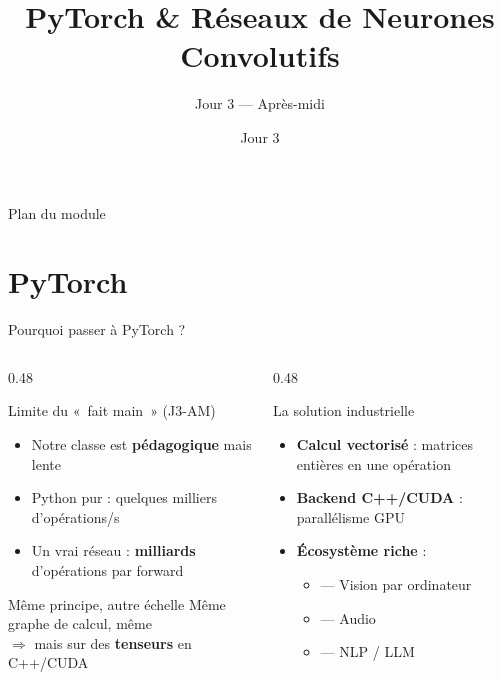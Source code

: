 \documentclass[aspectratio=169, 10pt]{beamer}
\title[PyTorch \& CNN]{PyTorch \& Réseaux de Neurones Convolutifs}
\subtitle{Jour 3 --- Après-midi}
\date{Jour 3}
\begin{document}

\begin{frame}
  \titlepage
\end{frame}

\begin{frame}{Plan du module}
  \tableofcontents
\end{frame}

\section{PyTorch}

\begin{frame}{Pourquoi passer à PyTorch ?}
  \begin{columns}[T]
    \begin{column}{0.48\textwidth}
      \begin{alertblock}{Limite du «~fait main~» (J3-AM)}
        \begin{itemize}
          \item Notre classe  est \textbf{pédagogique} mais lente
          \item Python pur : quelques milliers d'opérations/s
          \item Un vrai réseau : \textbf{milliards} d'opérations par forward
        \end{itemize}
      \end{alertblock}
      \smallskip
      \begin{exampleblock}{Même principe, autre échelle}
        Même graphe de calcul, même \\
        $\Rightarrow$ mais sur des \textbf{tenseurs} en C++/CUDA
      \end{exampleblock}
    \end{column}
    \begin{column}{0.48\textwidth}
      \begin{block}{La solution industrielle}
        \begin{itemize}
          \item \textbf{Calcul vectorisé} : matrices entières en une opération
          \item \textbf{Backend C++/CUDA} : parallélisme GPU
          \item \textbf{Écosystème riche} :
            \begin{itemize}
              \item {} — Vision par ordinateur
              \item {} — Audio
              \item {} — NLP / LLM
            \end{itemize}
        \end{itemize}
      \end{block}
    \end{column}
  \end{columns}
\end{frame}
\end{document}
